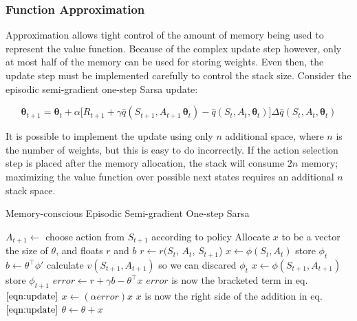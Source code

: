 \documentclass{article}
\begin{document}
	\subsubsection{Function Approximation}
	
	Approximation allows tight control of the amount of memory being used to represent the value function. Because of the complex update step however, only at most half of the memory can be used for storing weights. Even then, the update step must be implemented carefully to control the stack size. Consider the episodic semi-gradient one-step Sarsa update:
	
	\begin{equation}\label{eqn:update}
	\bm{\theta}_{t+1} = \bm{\theta}_t + \alpha \Big[R_{t+1} + \gamma \hat{q}(S_{t+1}, A_{t+1}\, \bm{\theta}_t) - \hat{q}(S_t, A_t, \bm{\theta}_t)\Big]\Delta\hat{q}(S_t, A_t, \bm{\theta}_t)\tag{1}
	\end{equation}

	It is possible to implement the update using only $n$ additional space, where $n$ is the number of weights, but this is easy to do incorrectly. If the action selection step is placed after the memory allocation, the stack will consume $2n$ memory; maximizing the value function over possible next states requires an additional $n$ stack space.
	
		\begin{algorithm}
			\caption{Memory-conscious Episodic Semi-gradient One-step Sarsa}
			\label{alg:update}
			\begin{algorithmic}[1] %
				\State $A_{t+1} \gets $ choose action from $S_{t+1}$ according to policy
				\State Allocate $x$ to be a vector the size of $\theta$, and floats $r$ and $b$
				\State $r\gets r(S_t$, $A_t$, $S_{t+1}$)
				\State $x \gets \phi(S_t, A_t)$ \Comment store $\phi_{t}$
				\State $b \gets \theta^\top \phi'$ \Comment calculate $v(S_{t+1},A_{t+1})$ so we can discared $\phi_{t}$
				\State $x \gets \phi(S_{t+1}, A_{t+1})$ \Comment store $\phi_{t+1}$
				\State $error \gets r + \gamma b - \theta^\top x$ \Comment $error$ is now the bracketed term in eq. $\ref{eqn:update}$
				\State $x \gets (\alpha error)x$ \Comment $x$ is now the right side of the addition in eq. $\ref{eqn:update}$
				\State $\theta \gets \theta + x$
				\
				\EndProcedure
			\end{algorithmic}
		\end{algorithm}
		
\end{document}
